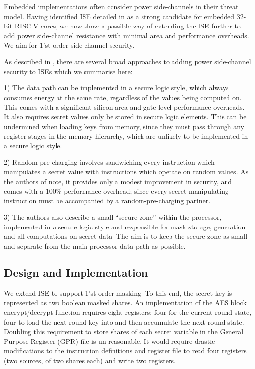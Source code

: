 
Embedded implementations often consider power side-channels in their threat
model.
Having identified ISE  detailed in
 as a strong candidate for embedded $32$-bit
RISC-V cores, we now show a possible
way of extending the ISE further to add power side-channel resistance
with minimal area and performance overheads.
We aim for $1$'st order side-channel security.

As described in \cite{TilGro:07}, there are several broad approaches
to adding power side-channel security to ISEs which we summarise here:

1) The data path can be implemented in a secure logic style, which always
consumes energy at the same rate, regardless of the values being computed on.
This comes with a significant silicon area and gate-level performance
overheads.
It also requires secret values only be stored in secure logic
elements.
This can be undermined when loading keys from memory, since they must
pass through any register stages in the memory hierarchy, which are
unlikely to be implemented in a secure logic style.

2) Random pre-charging involves sandwiching every instruction which
manipulates a secret value with instructions which operate on random values.
As the authors of \cite{TilGro:07} note, it provides only a modest
improvement in security, and comes with a $100\%$ performance overhead;
since every secret manipulating instruction must be accompanied by
a random-pre-charging partner.

3) The authors also describe a small ``secure zone'' within the processor,
implemented in a secure logic style and responsible for
mask storage, generation and all computations on secret data.
The aim is to keep the secure zone as small and separate from the main
processor data-path as possible.

\subsection{Design and Implementation}

We extend ISE  to support 1'st order masking.
To this end, the secret key is represented as two boolean masked shares.
An implementation of the AES block encrypt/decrypt function requires
eight registers: four for the current round state, four to load the
next round key into and then accumulate the next round state.
Doubling this requirement to store shares of each secret variable
in the General Purpose Register (GPR) file is un-reasonable.
It would require drastic modifications to the instruction definitions and
register file to read four registers (two sources, of two shares each) and
write two registers.

